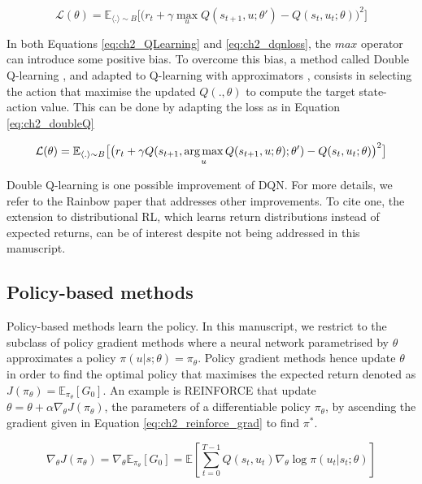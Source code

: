\begin{equation}
\label{eq:ch2_dqnloss}
    \mathcal{L}(\theta) = \mathbb{E}_{\langle . \rangle\sim B} \big[\big(r_{t} + \gamma \max_u Q(s_{t+1}, u; \theta')- Q(s_{t}, u_{t}; \theta)\big)^{2}\big]
\end{equation}



In both Equations \ref{eq:ch2_QLearning} and \ref{eq:ch2_dqnloss}, the $max$ operator can introduce some positive bias. 
To overcome this bias, a method called Double Q-learning \citep{hasselt2010double}, and adapted to Q-learning with approximators \citep{van2016deep}, consists in selecting the action that maximise the updated $Q(., \theta)$ to compute the target state-action value.
This can be done by adapting the loss as in Equation \ref{eq:ch2_doubleQ}

\begin{equation}
    \label{eq:ch2_doubleQ}
    \mathcal{L}(\theta) = \mathbb{E}_{\langle . \rangle\sim B} \big[\big(r_{t} + \gamma Q(s_{t+1}, \operatorname*{arg\,max}_u Q(s_{t+1}, u;\theta) ; \theta')- Q(s_{t}, u_{t}; \theta)\big)^{2}\big]
\end{equation}

Double Q-learning is one possible improvement of DQN.
For more details, we refer to the Rainbow paper \citep{hessel2018rainbow} that addresses other improvements.
To cite one, the extension to distributional RL, which learns return distributions instead of expected returns, can be of interest despite not being addressed in this manuscript. 

\subsection{Policy-based methods} \label{sec:ch2_policy_based_methods}

Policy-based methods learn the policy.
In this manuscript, we restrict to the subclass of policy gradient methods where a neural network parametrised by $\theta$ approximates a policy $\pi(u|s;\theta)=\pi_\theta$.
Policy gradient methods hence update $\theta$ in order to find the optimal policy that maximises the expected return denoted as  $J(\pi_\theta) = \mathbb{E}_{\pi_\theta}[G_0]$.
An example is REINFORCE \citep{williams1992simple} that update $\theta = \theta + \alpha \nabla_\theta J(\pi_\theta)$, the parameters of a differentiable policy $\pi_\theta$, by ascending the gradient given in Equation \ref{eq:ch2_reinforce_grad} to find $\pi^*$.

\begin{equation}
\label{eq:ch2_reinforce_grad}
    \nabla_\theta J(\pi_\theta) = \nabla_\theta \mathbb{E}_{\pi_\theta}[G_0] = \mathbb{E}\left[\sum_{t=0}^{T-1} Q(s_t, u_t) \nabla_\theta \log \pi(u_t|s_t;\theta)\right]
\end{equation}

